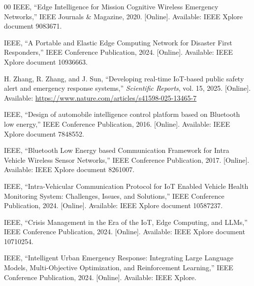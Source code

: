 \documentclass[conference]{IEEEtran}
\begin{document}
\begin{thebibliography}{00}
IEEE, ``Edge Intelligence for Mission Cognitive Wireless Emergency Networks,'' IEEE Journals \& Magazine, 2020. [Online]. Available: IEEE Xplore document 9083671.

IEEE, ``A Portable and Elastic Edge Computing Network for Disaster First Responders,'' IEEE Conference Publication, 2024. [Online]. Available: IEEE Xplore document 10936663.

H. Zhang, R. Zhang, and J. Sun, ``Developing real-time IoT-based public safety alert and emergency response systems,'' \textit{Scientific Reports}, vol. 15, 2025. [Online]. Available: \url{https://www.nature.com/articles/s41598-025-13465-7}

IEEE, ``Design of automobile intelligence control platform based on Bluetooth low energy,'' IEEE Conference Publication, 2016. [Online]. Available: IEEE Xplore document 7848552.

IEEE, ``Bluetooth Low Energy based Communication Framework for Intra Vehicle Wireless Sensor Networks,'' IEEE Conference Publication, 2017. [Online]. Available: IEEE Xplore document 8261007.

IEEE, ``Intra-Vehicular Communication Protocol for IoT Enabled Vehicle Health Monitoring System: Challenges, Issues, and Solutions,'' IEEE Conference Publication, 2024. [Online]. Available: IEEE Xplore document 10587237.

IEEE, ``Crisis Management in the Era of the IoT, Edge Computing, and LLMs,'' IEEE Conference Publication, 2024. [Online]. Available: IEEE Xplore document 10710254.

IEEE, ``Intelligent Urban Emergency Response: Integrating Large Language Models, Multi-Objective Optimization, and Reinforcement Learning,'' IEEE Conference Publication, 2024. [Online]. Available: IEEE Xplore.

\end{thebibliography}
\end{document}
